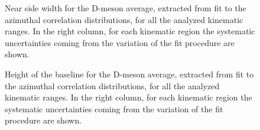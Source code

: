 \begin{figure}
\centering

\caption{Near side width for the D-meson average, extracted from fit to the azimuthal correlation distributions, for all the analyzed kinematic ranges. In the right column, for each kinematic region the systematic uncertainties coming from the variation of the fit procedure are shown.}
\label{fig:nearsidesigmaAverage}
\end{figure}

\begin{figure}
\centering
\caption{Height of the baseline for the D-meson average, extracted from fit to the azimuthal correlation distributions, for all the analyzed kinematic ranges. In the right column, for each kinematic region the systematic uncertainties coming from the variation of the fit procedure are shown.}
\label{fig:baselineAverage}
\end{figure}

